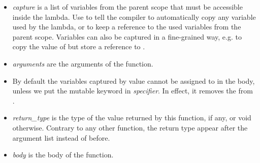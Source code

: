 \begin{itemize}
\item {\it capture} is a list of variables from the parent scope that
  must be accessible inside the lambda. Use \code{[=]} to tell the
  compiler to automatically copy any variable used by the lambda, or
  \code{[\&]} to keep a reference to the used variables from the
  parent scope. Variables can also be captured in a fine-grained way,
  e.g. \code{[=a, \&b]} to copy the value of  but store a
  reference to .
\item {\it arguments} are the arguments of the function.
\item By default the variables captured by value cannot be assigned to
  in the body, unless we put the mutable keyword in {\it
    specifier}. In effect, it removes the  from
  .
\item {\it return\_type} is the type of the value returned by this
  function, if any, or void otherwise. Contrary to any other
  function, the return type appear after the argument list instead of
  before.
\item {\it body} is the body of the function.
\end{itemize}

